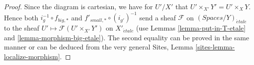 \documentclass{stacks-project}
\theoremstyle{plain}
\theoremstyle{definition}
\theoremstyle{remark}
\numberwithin{equation}{subsection}
\def\etale{{\acute{e}tale}}
\begin{document}
\begin{proof}
Since the diagram is cartesian, we have for $U'/X'$
that $U' \times_{X'} Y' = U' \times_X Y$. Hence both
$i_g^{-1} \circ f_{big, *}$ and $f'_{small, *} \circ (i_{g'})^{-1}$
send a sheaf $\mathcal{F}$ on $(\textit{Spaces}/Y)_\etale$ to the sheaf
$U' \mapsto \mathcal{F}(U' \times_{X'} Y')$ on $X'_\etale$
(use Lemmas \ref{lemma-put-in-T-etale} and \ref{lemma-morphism-big-etale}).
The second equality can be proved in the same manner or can be
deduced from the very general
Sites, Lemma \ref{sites-lemma-localize-morphism}.
\end{proof}
\end{document}
